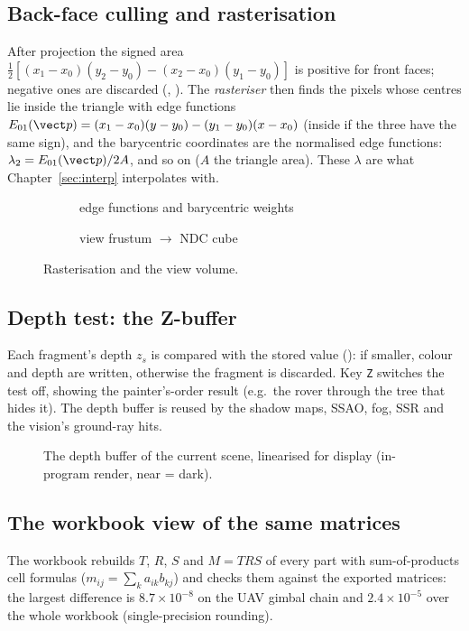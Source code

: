 \subsection{Back-face culling and rasterisation}
After projection the signed area $\tfrac12[(x_1-x_0)(y_2-y_0)-(x_2-x_0)(y_1-y_0)]$ is positive for front faces; negative ones are discarded (, ). The \emph{rasteriser} then finds the pixels whose centres lie inside the triangle with edge functions
$E_{01}(\vect p)=(x_1-x_0)(y-y_0)-(y_1-y_0)(x-x_0)$ (inside if the three have the same sign), and the barycentric coordinates are the normalised edge functions: $\lambda_2=E_{01}(\vect p)/2A$, and so on ($A$ the triangle area). These $\lambda$ are what Chapter~\ref{sec:interp} interpolates with.
\begin{figure}[h]
\centering
\begin{subfigure}{0.49\linewidth}\caption{edge functions and barycentric weights}\end{subfigure}
\begin{subfigure}{0.49\linewidth}\caption{view frustum $\to$ NDC cube}\end{subfigure}
\caption{Rasterisation and the view volume.}
\end{figure}

\subsection{Depth test: the Z-buffer}
Each fragment's depth $z_s$ is compared with the stored value (): if smaller, colour and depth are written, otherwise the fragment is discarded. Key \texttt{Z} switches the test off, showing the painter's-order result (e.g.\ the rover through the tree that hides it). The depth buffer is reused by the shadow maps, SSAO, fog, SSR and the vision's ground-ray hits.
\begin{figure}[h]
\centering
{}
\caption{The depth buffer of the current scene, linearised for display (in-program render, near = dark).}\label{fig:diag}
\end{figure}

\subsection{The workbook view of the same matrices}
The workbook rebuilds $T$, $R$, $S$ and $M=TRS$ of every part with sum-of-products cell formulas ($m_{ij}=\sum_k a_{ik}b_{kj}$) and checks them against the exported matrices: the largest difference is $8.7\times10^{-8}$ on the UAV gimbal chain and $2.4\times10^{-5}$ over the whole workbook (single-precision rounding).
\begin{figure}[h]
\centering
{}
\caption{}
\end{figure}
